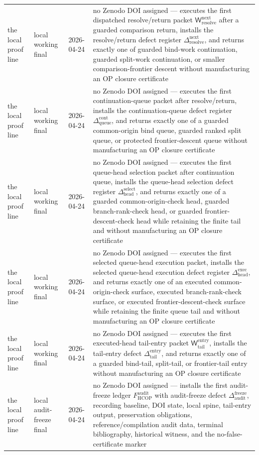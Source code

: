 \documentclass[12pt,a4paper]{article}
\begin{document}
{\begin{longtable}{|P{0.14\textwidth}|P{0.17\textwidth}|P{0.15\textwidth}|P{0.42\textwidth}|}
the local proof line & local working final & 2026-04-24 & no Zenodo DOI assigned --- executes the first dispatched resolve/return packet \(\mathsf W_{\mathrm{resolve}}^{\mathrm{next}}\) after a guarded comparison return, installs the resolve/return defect register \(\Delta_{\mathrm{resolve}}^{\mathrm{next}}\), and returns exactly one of guarded bind-work continuation, guarded split-work continuation, or smaller comparison-frontier descent without manufacturing an OP closure certificate \\
the local proof line & local working final & 2026-04-24 & no Zenodo DOI assigned --- executes the first continuation-queue packet after resolve/return, installs the continuation-queue defect register \(\Delta_{\mathrm{queue}}^{\mathrm{cont}}\), and returns exactly one of a guarded common-origin bind queue, guarded ranked split queue, or protected frontier-descent queue without manufacturing an OP closure certificate \\
the local proof line & local working final & 2026-04-24 & no Zenodo DOI assigned --- executes the first queue-head selection packet after continuation queue, installs the queue-head selection defect register \(\Delta_{\mathrm{head}}^{\mathrm{select}}\), and returns exactly one of a guarded common-origin-check head, guarded branch-rank-check head, or guarded frontier-descent-check head while retaining the finite tail and without manufacturing an OP closure certificate \\
the local proof line & local working final & 2026-04-24 & no Zenodo DOI assigned --- executes the first selected queue-head execution packet, installs the selected queue-head execution defect register \(\Delta_{\mathrm{head}}^{\mathrm{exec}}\), and returns exactly one of an executed common-origin-check surface, executed branch-rank-check surface, or executed frontier-descent-check surface while retaining the finite queue tail and without manufacturing an OP closure certificate \\
the local proof line & local working final & 2026-04-24 & no Zenodo DOI assigned --- executes the first executed-head tail-entry packet \(\mathsf W_{\mathrm{tail}}^{\mathrm{entry}}\), installs the tail-entry defect \(\Delta_{\mathrm{tail}}^{\mathrm{entry}}\), and returns exactly one of a guarded bind-tail, split-tail, or frontier-tail entry without manufacturing an OP closure certificate \\
the local proof line & local audit-freeze final & 2026-04-24 & no Zenodo DOI assigned --- installs the first audit-freeze ledger \(F_{\mathrm{HCOP}}^{\mathrm{audit}}\) with audit-freeze defect \(\Delta_{\mathrm{audit}}^{\mathrm{freeze}}\), recording baseline, DOI state, local spine, tail-entry output, preservation obligations, reference/compilation audit data, terminal bibliography, historical witness, and the no-false-certificate marker \\

\end{longtable}}
\end{document}
